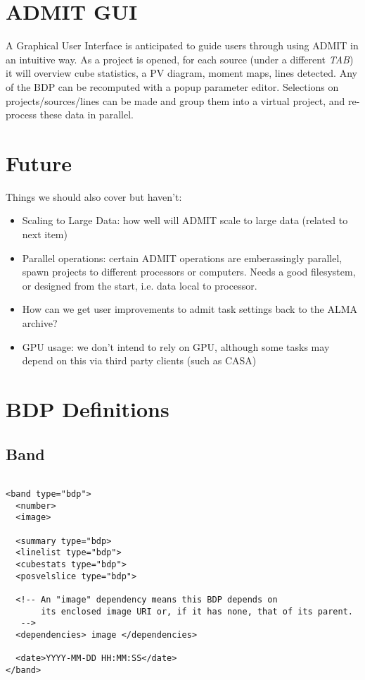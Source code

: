 \documentclass{article}
\begin{document}
\section{ADMIT GUI}

A Graphical User Interface is anticipated to guide users through 
using ADMIT in an intuitive way. As a project is opened, for each source
(under a different {\it TAB}) it will overview cube statistics, a PV diagram,
moment maps, lines detected.  Any of the BDP can be recomputed with a popup
parameter editor. Selections on projects/sources/lines can be made and group
them into a virtual project, and re-process these data in parallel.

\section{Future}

Things we should also cover but haven't:

\begin{itemize}

\item
Scaling to Large Data:  how well will ADMIT scale to large data (related
to next item)

\item
Parallel operations:  certain ADMIT operations are emberassingly parallel, spawn
projects to different processors or computers.  Needs a good filesystem, or
designed from the start, i.e. data local to processor.

\item
How can we get user improvements to admit task settings back to the ALMA archive?

\item
GPU usage: we don't intend to rely on GPU, although some tasks may depend on this
via third party clients (such as CASA)

\end{itemize}


\appendix
\section{BDP Definitions}

\subsection{Band}
\footnotesize
\begin{verbatim}

<band type="bdp">
  <number>
  <image>

  <summary type="bdp>
  <linelist type="bdp">
  <cubestats type="bdp">
  <posvelslice type="bdp">

  <!-- An "image" dependency means this BDP depends on 
       its enclosed image URI or, if it has none, that of its parent.
   -->
  <dependencies> image </dependencies>

  <date>YYYY-MM-DD HH:MM:SS</date>
</band>

\end{verbatim}
\end{document}
